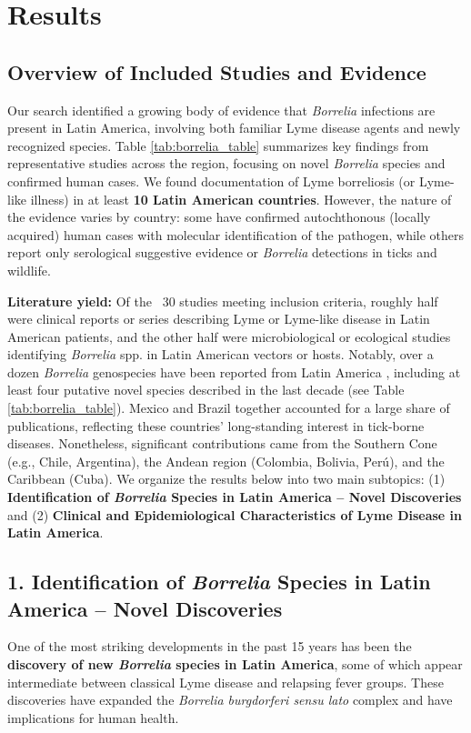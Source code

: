 \documentclass[11pt,letterpaper]{article}
\begin{document}
\section{Results}
\subsection{Overview of Included Studies and Evidence}
Our search identified a growing body of evidence that \textit{Borrelia} infections are present in Latin America, involving both familiar Lyme disease agents and newly recognized species. Table \ref{tab:borrelia_table} summarizes key findings from representative studies across the region, focusing on novel \textit{Borrelia} species and confirmed human cases. We found documentation of Lyme borreliosis (or Lyme-like illness) in at least \textbf{10 Latin American countries}. However, the nature of the evidence varies by country: some have confirmed autochthonous (locally acquired) human cases with molecular identification of the pathogen, while others report only serological suggestive evidence or \textit{Borrelia} detections in ticks and wildlife.

\textbf{Literature yield:} Of the ~30 studies meeting inclusion criteria, roughly half were clinical reports or series describing Lyme or Lyme-like disease in Latin American patients, and the other half were microbiological or ecological studies identifying \textit{Borrelia} spp. in Latin American vectors or hosts. Notably, over a dozen \textit{Borrelia} genospecies have been reported from Latin America \citep{Colunga-Salas2020a}, including at least four putative novel species described in the last decade (see Table \ref{tab:borrelia_table}). Mexico and Brazil together accounted for a large share of publications, reflecting these countries’ long-standing interest in tick-borne diseases. Nonetheless, significant contributions came from the Southern Cone (e.g., Chile, Argentina), the Andean region (Colombia, Bolivia, Perú), and the Caribbean (Cuba). We organize the results below into two main subtopics: (1) \textbf{Identification of \textit{Borrelia} Species in Latin America – Novel Discoveries} and (2) \textbf{Clinical and Epidemiological Characteristics of Lyme Disease in Latin America}.

\subsection{1. Identification of \textit{Borrelia} Species in Latin America – Novel Discoveries}
One of the most striking developments in the past 15 years has been the \textbf{discovery of new \textit{Borrelia} species in Latin America}, some of which appear intermediate between classical Lyme disease and relapsing fever groups. These discoveries have expanded the \textit{Borrelia burgdorferi sensu lato} complex and have implications for human health.
\end{document}
